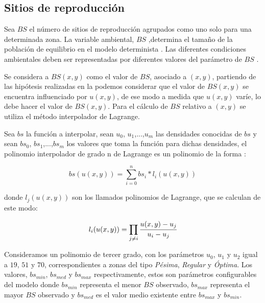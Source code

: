 \subsection{Sitios de reproducción}
\label{subsec:cap4-sitios de reproduccion}
Sea $BS$ el número de sitios de reproducción agrupados como uno solo para una determinada zona. La
variable ambiental, $BS$ ,determina el tamaño de la población de equilibrio en el modelo
determinista \cite{otero2006stochastic, otero2008stochastic}. Las diferentes condiciones
ambientales deben ser representadas por diferentes valores del parámetro de $BS$
\cite{otero2008stochastic}.

Se considera a $BS(x,y)$ como el valor de $BS$, asociado a $(x,y)$, partiendo de las hipótesis
realizadas en la  podemos considerar que el valor de $BS(x,y)$ se
encuentra influenciado por $u(x,y)$, de ese modo a medida que $u(x,y)$ varíe, lo debe hacer el
valor de $BS(x,y)$. Para el cálculo de $BS$ relativo a $(x,y)$ se utiliza el método interpolador
de Lagrange.

Sea $bs$ la función a interpolar, sean $u_0$, $u_1$,...,$u_m$ las densidades conocidas de $bs$ y
sean $bs_0$, $bs_1$,...,$bs_m$ los valores que toma la función para dichas densidades, el polinomio interpolador de grado n de Lagrange es un polinomio de la forma :

\begin{equation}
\label{eq:sitios-reproduccion-x-y}
    bs(u(x,y)) = \sum_{i=0}^{n} bs_{i} * l_{i}(u(x,y))
\end{equation}

donde $l_j(u(x,y))$ son los llamados polinomios de Lagrange, que se calculan de este modo:

\begin{equation}
\label{eq:sitios-reproduccion-x-y}
    l_{i}(u(x,y)) = \prod_{j \neq i} \cfrac{u(x,y) - u_{j}}{u_{i} - u_{j}}
\end{equation}

Consideramos un polinomio de tercer grado, con los parámetros $u_0$, $u_1$ y $u_2$ igual a $19$,
$51$ y $70$, correspondientes a zonas del tipo \textit{Pésima}, \textit{Regular} y \textit{Óptima}.
Los valores, $bs_{min}$, $bs_{med}$ y $bs_{max}$ respectivamente, estos son parámetros
configurables del modelo donde $bs_{min}$ representa el menor $BS$ observado, $bs_{max}$
representa el mayor $BS$ observado y  $bs_{med}$ es el valor medio existente entre $bs_{max}$ y
$bs_{min}$.
